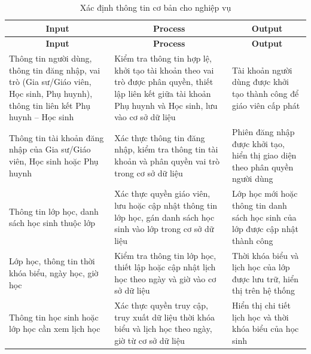 \begingroup
\renewcommand{\arraystretch}{1.5}
\setlength{\LTpre}{6pt}
\setlength{\LTpost}{6pt}
\begin{longtable}{|m{4.5cm}|m{5.8cm}|m{4.5cm}|}
    \caption{Xác định thông tin cơ bản cho nghiệp vụ} \label{tab:ipo-nghiep-vu} \\
    \hline
    \multicolumn{1}{|c|}{\textbf{Input}} & \multicolumn{1}{c|}{\textbf{Process}} & \multicolumn{1}{c|}{\textbf{Output}} \\ \hline
    \endfirsthead

    \hline
    \multicolumn{1}{|c|}{\textbf{Input}} & \multicolumn{1}{c|}{\textbf{Process}} & \multicolumn{1}{c|}{\textbf{Output}} \\ \hline
    \endhead

    \hline
    \endfoot

    \hline
    \endlastfoot

    Thông tin người dùng, thông tin đăng nhập, vai trò (Gia sư/Giáo viên, Học sinh, Phụ huynh), thông tin liên kết Phụ huynh -- Học sinh & 
    Kiểm tra thông tin hợp lệ, khởi tạo tài khoản theo vai trò được phân quyền, thiết lập liên kết giữa tài khoản Phụ huynh và Học sinh, lưu vào cơ sở dữ liệu & 
    Tài khoản người dùng được khởi tạo thành công để giáo viên cấp phát \\ \hline

    Thông tin tài khoản đăng nhập của Gia sư/Giáo viên, Học sinh hoặc Phụ huynh & 
    Xác thực thông tin đăng nhập, kiểm tra thông tin tài khoản và phân quyền vai trò trong cơ sở dữ liệu & 
    Phiên đăng nhập được khởi tạo, hiển thị giao diện theo phân quyền người dùng \\ \hline

    Thông tin lớp học, danh sách học sinh thuộc lớp & 
    Xác thực quyền giáo viên, lưu hoặc cập nhật thông tin lớp học, gán danh sách học sinh vào lớp trong cơ sở dữ liệu & 
    Lớp học mới hoặc thông tin danh sách học sinh của lớp được cập nhật thành công \\ \hline

    Lớp học, thông tin thời khóa biểu, ngày học, giờ học & 
    Kiểm tra thông tin lớp học, thiết lập hoặc cập nhật lịch học theo ngày và giờ vào cơ sở dữ liệu & 
    Thời khóa biểu và lịch học của lớp được lưu trữ, hiển thị trên hệ thống \\ \hline

    Thông tin học sinh hoặc lớp học cần xem lịch học & 
    Xác thực quyền truy cập, truy xuất dữ liệu thời khóa biểu và lịch học theo ngày, giờ từ cơ sở dữ liệu & 
    Hiển thị chi tiết lịch học và thời khóa biểu của học sinh \\ \hline


\end{longtable}
